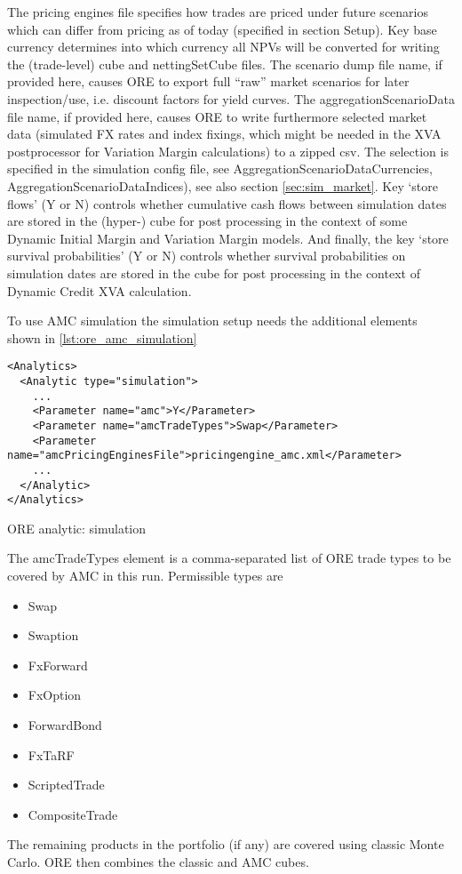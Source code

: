 {The pricing engines file specifies how trades are priced under future scenarios which can differ from pricing as of
today (specified in section Setup).  Key base currency determines into which currency all NPVs will be converted for
writing the (trade-level) cube and nettingSetCube files.
The scenario dump file name, if provided here, causes ORE to export full ``raw'' market scenarios for later inspection/use,
i.e. discount factors for yield curves.
The aggregationScenarioData file name, if provided here, causes ORE to write furthermore selected market data (simulated
FX rates and index fixings, which might be needed in the XVA postprocessor for Variation Margin calculations) to a zipped csv.
The selection is specified in the simulation config file, see AggregationScenarioDataCurrencies, AggregationScenarioDataIndices),
see also section \ref{sec:sim_market}.
Key `store flows' (Y or N) controls whether cumulative cash flows between simulation dates are stored in the (hyper-)
cube for post processing in the context of some Dynamic Initial Margin and Variation Margin models. And finally, the
key `store survival probabilities' (Y or N) controls whether survival probabilities on simulation dates are stored in the
cube for post processing in the context of Dynamic Credit XVA calculation.

\medskip
To use  AMC simulation the simulation setup needs the additional elements shown in \ref{lst:ore_amc_simulation}

\begin{listing}[H]
\begin{verbatim}
<Analytics>
  <Analytic type="simulation">
    ...
    <Parameter name="amc">Y</Parameter>
    <Parameter name="amcTradeTypes">Swap</Parameter>
    <Parameter name="amcPricingEnginesFile">pricingengine_amc.xml</Parameter> 
    ...
  </Analytic>
</Analytics>      
\end{verbatim}
\caption{ORE analytic: simulation}
\label{lst:ore_amc_simulation}
\end{listing}

The amcTradeTypes element is a comma-separated list of ORE trade types to be covered by AMC in this run. Permissible types are
\begin{itemize}
\item Swap
\item Swaption
\item FxForward
\item FxOption
\item ForwardBond
\item FxTaRF
\item ScriptedTrade
\item CompositeTrade
\end{itemize}
The remaining products in the portfolio (if any) are covered using classic Monte Carlo.
ORE then combines the classic and AMC cubes. 

}
